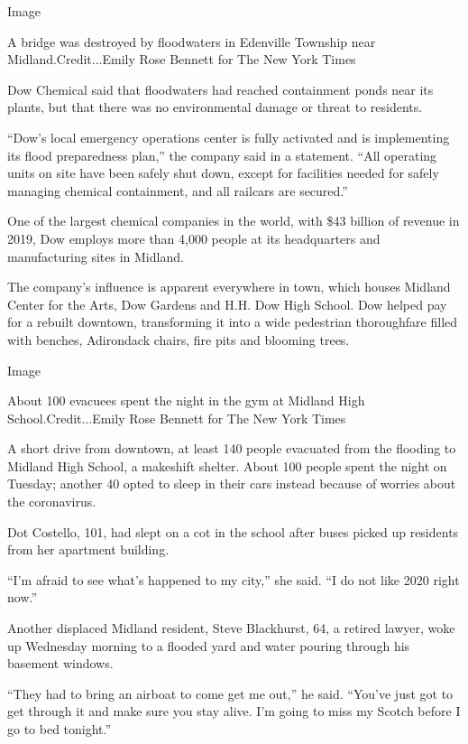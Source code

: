 Image

A bridge was destroyed by floodwaters in Edenville Township near
Midland.Credit...Emily Rose Bennett for The New York Times

Dow Chemical said that floodwaters had reached containment ponds near
its plants, but that there was no environmental damage or threat to
residents.

``Dow's local emergency operations center is fully activated and is
implementing its flood preparedness plan,'' the company said in a
statement. ``All operating units on site have been safely shut down,
except for facilities needed for safely managing chemical containment,
and all railcars are secured.''

One of the largest chemical companies in the world, with \$43 billion of
revenue in 2019, Dow employs more than 4,000 people at its headquarters
and manufacturing sites in Midland.

The company's influence is apparent everywhere in town, which houses
Midland Center for the Arts, Dow Gardens and H.H. Dow High School. Dow
helped pay for a rebuilt downtown, transforming it into a wide
pedestrian thoroughfare filled with benches, Adirondack chairs, fire
pits and blooming trees.

Image

About 100 evacuees spent the night in the gym at Midland High
School.Credit...Emily Rose Bennett for The New York Times

A short drive from downtown, at least 140 people evacuated from the
flooding to Midland High School, a makeshift shelter. About 100 people
spent the night on Tuesday; another 40 opted to sleep in their cars
instead because of worries about the coronavirus.

Dot Costello, 101, had slept on a cot in the school after buses picked
up residents from her apartment building.

``I'm afraid to see what's happened to my city,'' she said. ``I do not
like 2020 right now.''

Another displaced Midland resident, Steve Blackhurst, 64, a retired
lawyer, woke up Wednesday morning to a flooded yard and water pouring
through his basement windows.

``They had to bring an airboat to come get me out,'' he said. ``You've
just got to get through it and make sure you stay alive. I'm going to
miss my Scotch before I go to bed tonight.''

\href{https://www.nytimes.com/news-event/coronavirus?action=click\&pgtype=Article\&state=default\&region=MAIN_CONTENT_3\&context=storylines_faq}{}

